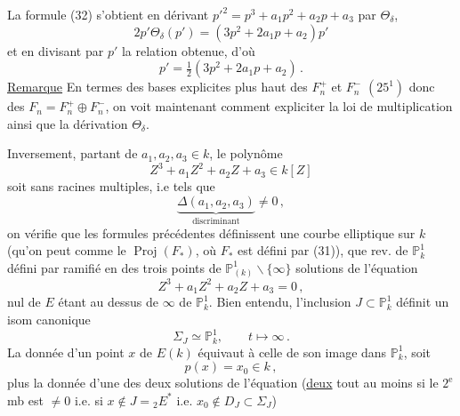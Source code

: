 La formule (32) s'obtient en dérivant $ {p'}^2=p^3+a_1p^2+a_2p+a_3$ par $\Theta_\delta$,  
\[
 2p'\Theta_\delta(p')=(3p^2+2a_1p+a_2)p'
\]
et en divisant par $p'$ la relation obtenue, d'où
\[
 p'=\tfrac12(3p^2+2a_1p+a_2)\,. \tag*{(33)}
\]
\uline{Remarque} En termes des bases explicites plus haut des $F_n^+$ et $F_n^-$ $(25^1)$ donc des $F_n=F_n^+\oplus F_n^-$, on voit maintenant comment expliciter la loi de multiplication  ainsi que
la dérivation $\Theta_\delta$.

Inversement, partant de $a_1,a_2,a_3\in k$,   le polynôme
\[
 Z^3+a_1Z^2+a_2Z+a_3\in k[Z]
\]
soit sans racines multiples, i.e tels que
\[
 \underbrace{\Delta(a_1,a_2,a_3)}_{\text{discriminant}}\ne0\,, \tag*{(34)}
\]
on vérifie que les formules précédentes définissent une courbe elliptique sur $k$ (qu'on peut   comme le $\operatorname{Proj}(F_*)$, où $F_*$ est défini par (31)),   que rev.   de $\mathbb P^1_k$ défini par
ramifié en  des trois points  de $\mathbb P^1_{(k)}\smallsetminus\{\infty\}$  solutions de l'équation
\[
 Z^3+a_1Z^2+a_2Z+a_3=0\,, \tag*{(36)}
\]
  nul de $E$ étant au dessus de   $\infty$ de $\mathbb P^1_k$.  Bien  entendu, l'inclusion $J\subset\mathbb P^1_k$ définit un isom canonique
\[
 \Sigma_J\simeq\mathbb P^1_k,\qquad t\mapsto\infty\,. \tag*{(37}
\]
La donnée d'un point $x$  de $E(k)$ équivaut à celle de son image dans $\mathbb P^1_k$, soit 
\[
 p(x)=x_0\in k\,, \tag*{(38)}
\]
plus la donnée d'une des deux solutions  de l'équation (\uline{deux} tout au moins si le $2^{\mathrm e}$ mb est $\ne0$ i.e. si $x\notin J={}_2E^*$ i.e. $x_0\notin D_J\subset\Sigma_J$)
